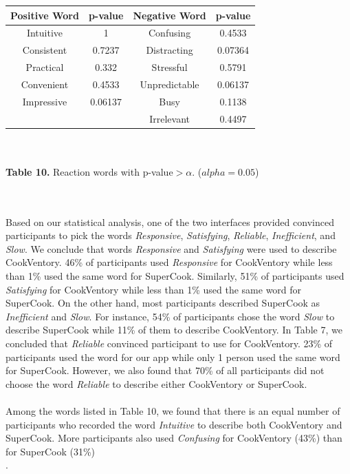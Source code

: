\documentclass{sigchi}
\begin{document}
\begin{center}
	\begin{tabular}{ |c|c|c|c| }
		\hline
			\textbf{Positive Word} & \textbf{p-value} & \textbf{Negative Word} & \textbf{p-value}\\ 
		\hline
			Intuitive &1& Confusing & 0.4533 \\
			Consistent & 0.7237 &Distracting & 0.07364 \\
			Practical & 0.332 & Stressful & 0.5791 \\
			Convenient & 0.4533 & Unpredictable & 0.06137 \\
			Impressive & 0.06137 & Busy & 0.1138 \\
			& & Irrelevant & 0.4497 \\
		\hline
	\end{tabular}
	\\~\\
	\textbf{Table 10.} Reaction words with p-value$ > \alpha$. ($alpha = 0.05$)\\~\\~\\
\end{center}

	 Based on our statistical analysis, one of the two interfaces provided convinced participants to pick the words \textit{Responsive}, \textit{Satisfying}, \textit{Reliable}, \textit{Inefficient}, and \textit{Slow}. We conclude that words \textit{Responsive} and \textit{Satisfying} were used to describe CookVentory. 46\% of participants used \textit{Responsive} for CookVentory while less than 1\% used the same word for SuperCook. Similarly, 51\% of participants used \textit{Satisfying} for CookVentory while less than 1\% used the same word for SuperCook.  On the other hand, most participants described SuperCook as \textit{Inefficient} and \textit{Slow}. For instance, 54\% of participants chose the word \textit{Slow} to describe SuperCook while 11\% of them to describe CookVentory. In Table 7, we concluded that \textit{Reliable} convinced participant to use for CookVentory. 23\% of participants used the word for our app while only 1 person used the same word for SuperCook. However, we also found that 70\% of all participants did not choose the word \textit{Reliable} to describe either CookVentory or SuperCook.\\~\\
     Among the words listed in Table 10, we found that there is an equal number of participants who recorded the word \textit{Intuitive} to describe both CookVentory and SuperCook. More participants also used \textit{Confusing} for CookVentory (43\%) than for SuperCook (31\%) \\. 
     
\end{document}
